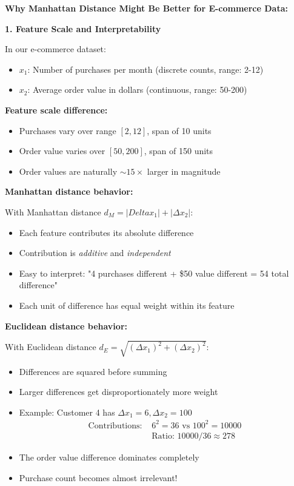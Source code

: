 \documentclass[12pt]{article}
\begin{document}
\begin{explanation}
\textbf{Why Manhattan Distance Might Be Better for E-commerce Data:}

\textbf{1. Feature Scale and Interpretability}

In our e-commerce dataset:
\begin{itemize}
    \item \(x_1\): Number of purchases per month (discrete counts, range: 2-12)
    \item \(x_2\): Average order value in dollars (continuous, range: 50-200)
\end{itemize}

\textbf{Feature scale difference:}
\begin{itemize}
    \item Purchases vary over range \([2, 12]\), span of 10 units
    \item Order value varies over \([50, 200]\), span of 150 units
    \item Order values are naturally \(\sim15\times\) larger in magnitude
\end{itemize}

\textbf{Manhattan distance behavior:}

With Manhattan distance \(d_M = |Delta x_1| + |\Delta x_2|\):
\begin{itemize}
    \item Each feature contributes its absolute difference
    \item Contribution is \textit{additive} and \textit{independent}
    \item Easy to interpret: "4 purchases different + \$50 value different = 54 total difference"
    \item Each unit of difference has equal weight within its feature
\end{itemize}

\textbf{Euclidean distance behavior:}

With Euclidean distance \(d_E = \sqrt{(\Delta x_1)^2 + (\Delta x_2)^2}\):
\begin{itemize}
    \item Differences are squared before summing
    \item Larger differences get disproportionately more weight
    \item Example: Customer 4 has \(\Delta x_1 = 6, \Delta x_2 = 100\)
    \begin{align*}
        \text{Contributions: } &6^2 = 36 \text{ vs } 100^2 = 10000 \\
        &\text{Ratio: } 10000/36 \approx 278
    \end{align*}
    \item The order value difference dominates completely
    \item Purchase count becomes almost irrelevant!
\end{itemize}


\end{explanation}
\end{document}
